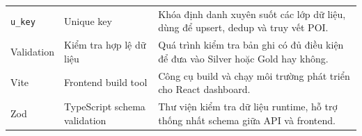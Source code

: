 \documentclass[12pt,a4paper]{article}
\begin{document}
\begin{longtable}{@{}p{}p{}p{}@{}}
\texttt{u\_key} & Unique key & Khóa định danh xuyên suốt các lớp dữ liệu, dùng để upsert, dedup và truy vết POI. \\

Validation & Kiểm tra hợp lệ dữ liệu & Quá trình kiểm tra bản ghi có đủ điều kiện để đưa vào Silver hoặc Gold hay không. \\

Vite & Frontend build tool & Công cụ build và chạy môi trường phát triển cho React dashboard. \\

Zod & TypeScript schema validation & Thư viện kiểm tra dữ liệu runtime, hỗ trợ thống nhất schema giữa API và frontend. \\

\bottomrule
\end{longtable}
\end{document}
